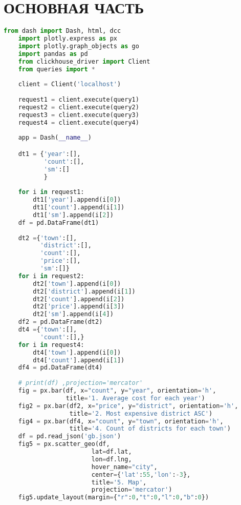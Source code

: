 \chapter[Основная часть]{ОСНОВНАЯ ЧАСТЬ}


\begin{lstlisting}[language=Python, caption=Код;]
    from dash import Dash, html, dcc
    import plotly.express as px
    import plotly.graph_objects as go
    import pandas as pd
    from clickhouse_driver import Client
    from queries import *
    
    client = Client('localhost')
    
    request1 = client.execute(query1)
    request2 = client.execute(query2)
    request3 = client.execute(query3)
    request4 = client.execute(query4)
    
    app = Dash(__name__)

    dt1 = {'year':[],
           'count':[],
           'sm':[]
           }
    
    for i in request1:
        dt1['year'].append(i[0])
        dt1['count'].append(i[1])
        dt1['sm'].append(i[2])
    df = pd.DataFrame(dt1)
    
    dt2 ={'town':[],
          'district':[],
          'count':[],
          'price':[],
          'sm':[]}
    for i in request2:
        dt2['town'].append(i[0])
        dt2['district'].append(i[1])
        dt2['count'].append(i[2])
        dt2['price'].append(i[3])
        dt2['sm'].append(i[4])
    df2 = pd.DataFrame(dt2)
    dt4 ={'town':[],
          'count':[],}
    for i in request4:
        dt4['town'].append(i[0])
        dt4['count'].append(i[1])
    df4 = pd.DataFrame(dt4)
    
    # print(df) ,projection='mercator'
    fig = px.bar(df, x="count", y="year", orientation='h', 
                 title='1. Average cost for each year')
    fig2 = px.bar(df2, x="price", y="district", orientation='h', 
                  title='2. Most expensive district ASC')
    fig4 = px.bar(df4, x="count", y="town", orientation='h', 
                  title='4. Count of districts for each town')
    df = pd.read_json('gb.json')
    fig5 = px.scatter_geo(df,
                        lat=df.lat,
                        lon=df.lng,
                        hover_name="city", 
                        center={'lat':55,'lon':-3}, 
                        title='5. Map',
                        projection='mercator')
    fig5.update_layout(margin={"r":0,"t":0,"l":0,"b":0})
    

\end{lstlisting}
